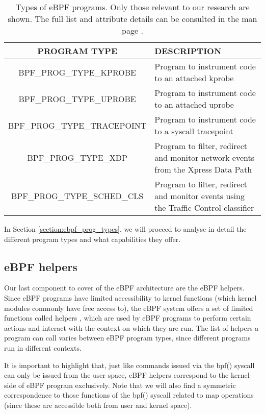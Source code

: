\begin{table}[htbp]
\begin{tabular}{|c|>{\centering\arraybackslash}p{5cm}|}
\hline
\textbf{PROGRAM TYPE} & \textbf{DESCRIPTION}\\
\hline
\hline
BPF\_PROG\_TYPE\_KPROBE & Program to instrument code to an attached kprobe\\
\hline
BPF\_PROG\_TYPE\_UPROBE & Program to instrument code to an attached uprobe\\
\hline
BPF\_PROG\_TYPE\_TRACEPOINT & Program to instrument code to a syscall tracepoint\\
\hline
BPF\_PROG\_TYPE\_XDP & Program to filter, redirect and monitor network events from the Xpress Data Path\\
\hline
BPF\_PROG\_TYPE\_SCHED\_CLS & Program to filter, redirect and monitor events using the Traffic Control classifier\\
\hline
\end{tabular}
\caption{Types of eBPF programs. Only those relevant to our research are shown. The full list and attribute details can be consulted in the man page \cite{bpf_syscall}.}
\label{table:ebpf_prog_types}
\end{table}

In Section \ref{section:ebpf_prog_types}, we will proceed to analyse in detail the different program types and what capabilities they offer.

\subsection{eBPF helpers} \label{subsection:ebpf_helpers}
Our last component to cover of the eBPF architecture are the eBPF helpers. Since eBPF programs have limited accessibility to kernel functions (which kernel modules commonly have free access to), the eBPF system offers a set of limited functions called helpers \cite{ebpf_helpers}, which are used by eBPF programs to perform certain actions and interact with the context on which they are run. The list of helpers a program can call varies between eBPF program types, since different programs run in different contexts.

It is important to highlight that, just like commands issued via the bpf() syscall can only be issued from the user space, eBPF helpers correspond to the kernel-side of eBPF program exclusively. Note that we will also find a symmetric correspondence to those functions of the bpf() syscall related to map operations (since these are accessible both from user and kernel space).

